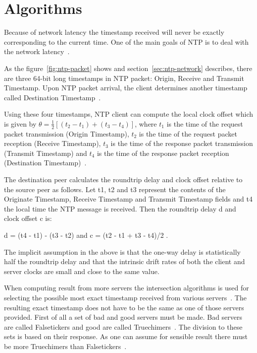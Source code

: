 
\section{Algorithms}
Because of network latency the timestamp received will never be exactly
corresponding to the current time.
One of the main goals of NTP is to deal with the network latency~\cite{ntp-overview}.

As the figure~\ref{fig:ntp-packet} shows and section~\ref{sec:ntp-network} describes,
there are three 64-bit long timestamps in NTP packet: Origin, Receive and Transmit Timestamp.
Upon NTP packet arrival, the client determines another timestamp called
Destination Timestamp~\cite{rfc5905}.

Using these four timestamps, NTP client can compute
the local clock offset which is given by $\theta = \frac{1}{2}[(t_2 - t_1) + (t_3 - t_4)]$,
where $t_1$ is the time of the request packet transmission (Origin Timestamp),
$t_2$ is the time of the request packet reception (Receive Timestamp),
$t_3$ is the time of the response packet transmission (Transmit Timestamp) and
$t_4$ is the time of the response packet reception (Destination Timestamp)~\cite{ntp-algor,rfc5905}.


The destination peer calculates the roundtrip delay and clock
      offset relative to the source peer as follows.  Let t1, t2 and t3
      represent the contents of the Originate Timestamp, Receive
      Timestamp and Transmit Timestamp fields and t4 the local time the
      NTP message is received.  Then the roundtrip delay d and clock
      offset c is:

         d = (t4 - t1) - (t3 - t2)  and  c = (t2 - t1 + t3 - t4)/2 .

      The implicit assumption in the above is that the one-way delay is
      statistically half the roundtrip delay and that the intrinsic
      drift rates of both the client and server clocks are small and
      close to the same value.

When computing result from more servers the intersection algorithms is used
for selecting the possible most exact timestamp received from various servers~\cite{rfc5905}.
The resulting exact timestamp does not have to be the same
as one of those servers provided.
First of all a set of bad and good servers must be made.
Bad servers are called Falsetickers and good are called Truechimers~\cite{rfc5905}.
The division to these sets is based on their response.
As one can assume for sensible result there must be more Truechimers than Falsetickers~\cite{rfc5905}.

